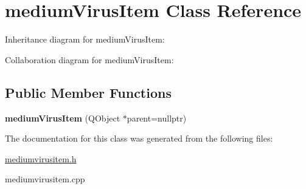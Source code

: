 \hypertarget{classmediumVirusItem}{}\section{medium\+Virus\+Item Class Reference}
\label{classmediumVirusItem}


Inheritance diagram for medium\+Virus\+Item\+:


Collaboration diagram for medium\+Virus\+Item\+:
\subsection*{Public Member Functions}
\begin{DoxyCompactItemize}
\item 
\mbox{\label{classmediumVirusItem_ac50963853d1f76c1627d3b6e447d9102}} 
{\bfseries medium\+Virus\+Item} (Q\+Object $\ast$parent=nullptr)
\end{DoxyCompactItemize}


The documentation for this class was generated from the following files\+:\begin{DoxyCompactItemize}
\item 
\hyperlink{mediumvirusitem_8h}{mediumvirusitem.\+h}\item 
mediumvirusitem.\+cpp\end{DoxyCompactItemize}
